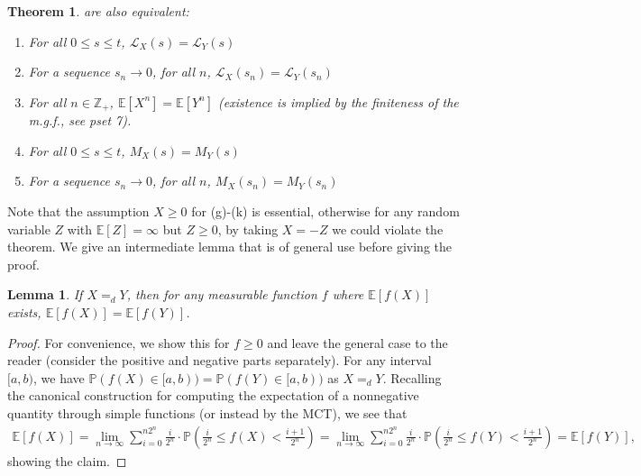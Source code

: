 \documentclass{article}
\newtheorem{theorem}{Theorem}
\newtheorem{lemma}{Lemma}
\theoremstyle{definition}
\renewcommand{\P}{\mathbb P}
\newcommand{\E}{\mathbb E}
\newcommand{\1}{\mathbb I}
\newcommand{\Z}{\mathbb Z}
\begin{document}
\begin{theorem}
  are also equivalent:
  \begin{enumerate}
  \item [g.] For all $0 \leq s \leq t$, $\mathcal L_X(s) = \mathcal L_Y(s)$
  \item [h.] For a sequence $s_n \to 0$, for all $n$, $\mathcal L_X(s_n) = \mathcal L_Y(s_n)$
  \item [i.] For all $n \in \Z_+$, $\E[X^n] = \E[Y^n]$ (existence is implied by the finiteness of the m.g.f., see pset 7).
    \item [j.] For all $0 \leq s \leq t$, $M_X(s) = M_Y(s)$
  \item [k.] For a sequence $s_n \to 0$, for all $n$, $M_X(s_n) = M_Y(s_n)$
  \end{enumerate}
\end{theorem}
Note that the assumption $X \geq 0$ for (g)-(k) is essential,
otherwise for any random variable $Z$ with $\E[Z] = \infty$ but $Z
\geq 0$, by taking $X = -Z$ we could violate the theorem.  We give an
intermediate lemma that is of general use before giving the proof.
\begin{lemma}
  \label{lem:expectation}
  If $X =_d Y$, then for any measurable function $f$ where $\E[f(X)]$
  exists, $\E[f(X)] = \E[f(Y)]$.
\end{lemma}
\begin{proof}
  For convenience, we show this for $f \geq 0$ and leave the general
  case to the reader (consider the positive and negative parts
  separately).  For any interval $[a,b)$, we have $\P(f(X) \in [a,b))
  = \P(f(Y) \in [a,b))$ as $X =_d Y$.  Recalling the canonical
  construction for computing the expectation of a nonnegative quantity
  through simple functions (or instead by the MCT), we see that
  \begin{align*}
    \E[f(X)] = \lim_{n \to \infty} \sum_{i=0}^{n2^{n}}
    \frac i {2^n} \cdot\P\left(\frac{i}{2^n} \leq f(X) < \frac{i+1}{2^n}\right) = \lim_{n
      \to \infty} \sum_{i=0}^{n2^n} \frac i {2^n} \cdot\P\left(\frac{i}{2^n} \leq f(Y) <
      \frac{i+1}{2^n}\right) = \E[f(Y)],
  \end{align*}
  showing the claim.
\end{proof}
\end{document}
